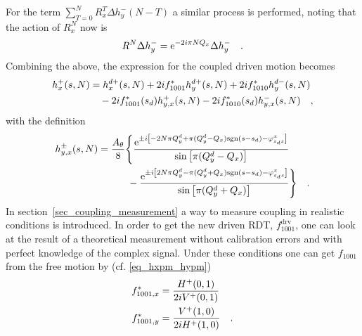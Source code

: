 %
For the term $\sum\limits_{T = 0}^N R_x^{T}\Delta h_y^-(N-T) $ a similar process is performed, noting that
the action of $R_x^N$ now is 
%
\begin{equation}
R^N\Delta h_y^- = \text{e}^{-2 i \pi N Q_x} \Delta h_y^-
\quad .
\end{equation}
%
Combining the above, the expression for the coupled driven motion becomes
%
\begin{align}
    h_x^+(s,N)&=
    h_x^{d+}(s,N) + 2if^{*}_{1001}  h_y^{d+}(s,N) + 2if^{*}_{1010} h_y^{d-}(s,N) \notag \\
    &\quad
    -2if^*_{1001}(s_d) h_{y,x}^+(s,N)
    -2if^*_{1010}(s_d) h_{y,x}^-(s,N)
    \quad ,
\end{align}
with the definition
%
\begin{align}
    h_{y,x}^\pm(s,N) &= 
        \frac{A_\theta}{8} \Bigg\{
             \frac{\text{e}^{\pm i \left[-2N \pi Q_y^d + \pi( Q_y^d - Q_x )\text{sgn}(s-s_d) - \varphi_{s_ds}^{x}\right]}}
                {\sin\left[\pi (Q_y^d - Q_x)\right]}
                \notag \\  & \quad\quad\quad
            -\frac{\text{e}^{ \pm i \left[2N\pi Q_y^d - \pi( Q_y^d + Q_x )\text{sgn}(s-s_d) - \varphi_{s_ds}^{x}\right]}}
                {\sin\left[\pi (Q_y^d + Q_x)\right]}
        \Bigg\}
        \quad .
\end{align}
%
%
In section~\ref{sec_coupling_measurement} a way to measure coupling in realistic conditions is introduced.
In order to get the new driven RDT, $f_{1001}^\text{drv}$, one can look at the result of a theoretical
measurement without calibration errors and with perfect knowledge of the complex signal.
Under these conditions one can get $f_{1001}$ from the free motion by (cf. \eqref{eq_hxpm_hypm})
%
\begin{align}
    f_{1001,x}^* &= \frac{H^+(0,1)}{2iV^+(0,1)}
    \label{eq_f1001x_from_complex}
    \\
    f_{1001,y}^* &= \frac{V^+(1,0)}{2iH^+(1,0)}
    \label{eq_f1001y_from_complex}
    \quad .
\end{align}
